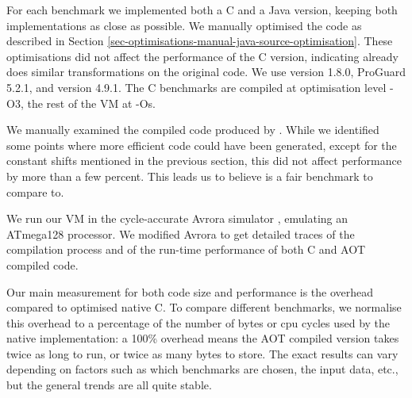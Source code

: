 For each benchmark we implemented both a C and a Java version, keeping both implementations as close as possible. We manually optimised the code as described in Section \ref{sec-optimisations-manual-java-source-optimisation}. These optimisations did not affect the performance of the C version, indicating  already does similar transformations on the original code. We use  version 1.8.0, ProGuard 5.2.1, and  version 4.9.1. The C benchmarks are compiled at optimisation level -O3, the rest of the VM at -Os.

We manually examined the compiled code produced by . While we identified some points where more efficient code could have been generated, except for the constant shifts mentioned in the previous section, this did not affect performance by more than a few percent. This leads us to believe  is a fair benchmark to compare to.

We run our VM in the cycle-accurate Avrora simulator \cite{Titzer:2005vb}, emulating an ATmega128 processor. We modified Avrora to get detailed traces of the compilation process and of the run-time performance of both C and AOT compiled code.

Our main measurement for both code size and performance is the overhead compared to optimised native C. To compare different benchmarks, we normalise this overhead to a percentage of the number of bytes or cpu cycles used by the native implementation: a 100\% overhead means the AOT compiled version takes twice as long to run, or twice as many bytes to store. The exact results can vary depending on factors such as which benchmarks are chosen, the input data, etc., but the general trends are all quite stable.
